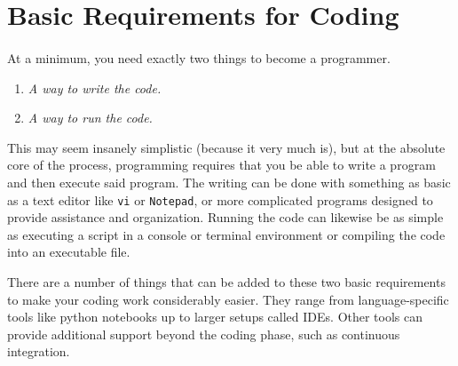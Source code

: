 \section{Basic Requirements for Coding}
\paragraph{} At a minimum, you need exactly two things to become a programmer.
\begin{enumerate}
    \item \textit{A way to write the code.}
    \item \textit{A way to run the code.}
\end{enumerate}

This may seem insanely simplistic (because it very much is), but at the absolute core of the process, programming requires that you be able to write a program and then execute said program.
The writing can be done with something as basic as a text editor like \texttt{vi} or \texttt{Notepad}, or more complicated programs designed to provide assistance and organization.
Running the code can likewise be as simple as executing a script in a console or terminal environment or compiling the code into an executable file.

There are a number of things that can be added to these two basic requirements to make your coding work considerably easier.
They range from language-specific tools like python notebooks up to larger setups called IDEs.
Other tools can provide additional support beyond the coding phase, such as continuous integration.